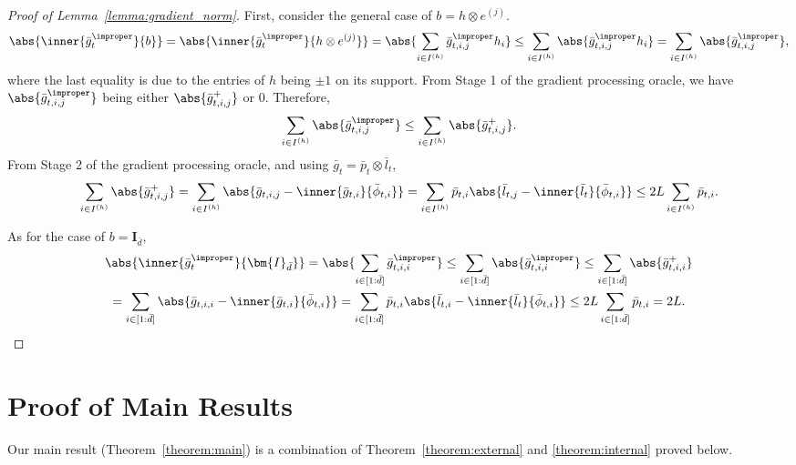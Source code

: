 \documentclass[10pt]{article}
\begin{document}
\begin{proof}[Proof of Lemma~\ref{lemma:gradient_norm}]
First, consider the general case of $b=h\otimes e^{(j)}$. 
\begin{equation*}
\abs{\inner{\bar g_t^\improper}{b}}=\abs{\inner{\bar g_t^\improper}{h\otimes e^{(j)}}}=\abs{\sum_{i\in I^{(h)}}\bar g^\improper_{t,i,j}h_{i}}
\leq \sum_{i\in I^{(h)}}\abs{\bar g^\improper_{t,i,j}h_{i}}=\sum_{i\in I^{(h)}}\abs{\bar g^\improper_{t,i,j}},
\end{equation*}
where the last equality is due to the entries of $h$ being $\pm 1$ on its support. From Stage 1 of the gradient processing oracle, we have $\abs{\bar g^\improper_{t,i,j}}$ being either $\abs{\bar g^+_{t,i,j}}$ or $0$. Therefore,
\begin{equation*}
\sum_{i\in I^{(h)}}\abs{\bar g^\improper_{t,i,j}}\leq \sum_{i\in I^{(h)}}\abs{\bar g^+_{t,i,j}}.
\end{equation*}
From Stage 2 of the gradient processing oracle, and using $\bar g_t=\bar p_t\otimes \bar l_t$,
\begin{equation*}
\sum_{i\in I^{(h)}}\abs{\bar g^+_{t,i,j}}=\sum_{i\in I^{(h)}}\abs{\bar g_{t,i,j}-\inner{\bar g_{t,i}}{\bar\phi_{t,i}}}=\sum_{i\in I^{(h)}}\bar p_{t,i}\abs{\bar l_{t,j}-\inner{\bar l_t}{\bar\phi_{t,i}}}\leq 2L\sum_{i\in I^{(h)}}\bar p_{t,i}.
\end{equation*}

As for the case of $b=\bm{I}_{\bar d}$, 
\begin{multline*}
\abs{\inner{\bar g_t^\improper}{\bm{I}_{\bar d}}}=\abs{\sum_{i\in [1:\bar d]}\bar g^\improper_{t,i,i}}\leq \sum_{i\in [1:\bar d]}\abs{\bar g^\improper_{t,i,i}}\leq \sum_{i\in [1:\bar d]}\abs{\bar g^+_{t,i,i}}\\
=\sum_{i\in [1:\bar d]}\abs{\bar g_{t,i,i}-\inner{\bar g_{t,i}}{\bar\phi_{t,i}}}=\sum_{i\in [1:\bar d]}\bar p_{t,i}\abs{\bar l_{t,i}-\inner{\bar l_{t}}{\bar\phi_{t,i}}}\leq 2L\sum_{i\in [1:\bar d]}\bar p_{t,i}=2L.\qedhere
\end{multline*}
\end{proof}

\section{Proof of Main Results}\label{section:proof_main}

Our main result (Theorem~\ref{theorem:main}) is a combination of Theorem~\ref{theorem:external} and \ref{theorem:internal} proved below. 
\end{document}
